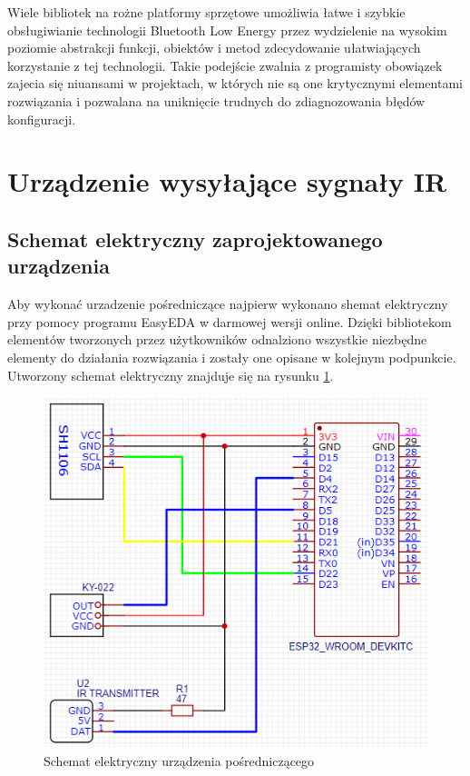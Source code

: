 \documentclass[12pt,twoside]{article}
\begin{document}
Wiele bibliotek na rożne platformy sprzętowe umożliwia łatwe i szybkie obsługiwianie technologii Bluetooth Low Energy przez wydzielenie na wysokim poziomie abstrakcji funkcji, obiektów i metod zdecydowanie ułatwiających korzystanie z tej technologii. Takie podejście zwalnia z programisty obowiązek zajecia się niuansami w projektach, w których nie są one krytycznymi elementami rozwiązania i pozwalana na uniknięcie trudnych do zdiagnozowania błędów konfiguracji.

\clearpage

\section{Urządzenie wysyłające sygnały IR}
\subsection{Schemat elektryczny zaprojektowanego urządzenia}
Aby wykonać urzadzenie pośredniczące najpierw wykonano shemat elektryczny przy pomocy programu EasyEDA w darmowej wersji online\cite{easyEda}. Dzięki bibliotekom elementów tworzonych przez użytkowników odnalziono wszystkie niezbędne elementy do działania rozwiązania i zostały one opisane w kolejnym podpunkcie. Utworzony schemat elektryczny znajduje się na rysunku \ref*{Fig:deviceScheme}.
\begin{figure}[ht]
   \centering
   \includegraphics[width=12cm]{images/deviceScheme.png}
   \caption{Schemat elektryczny urządzenia pośredniczącego}
   \label{Fig:deviceScheme}
\end{figure}
\end{document}
